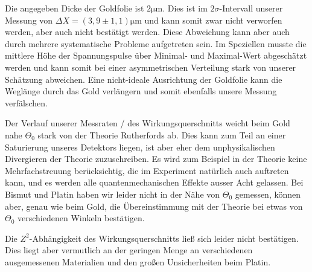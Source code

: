 Die angegeben Dicke der Goldfolie ist $2\si{\micro\meter}$.
Dies ist im $2\sigma$-Intervall unserer Messung von $\Delta X = (3,9 \pm 1,1)\si{\micro\meter}$ und kann somit zwar nicht verworfen werden,
aber auch nicht bestätigt werden. Diese Abweichung kann aber auch durch mehrere systematische Probleme aufgetreten sein.
Im Speziellen musste die mittlere Höhe der Spannungspulse über Minimal- und Maximal-Wert abgeschätzt werden und kann somit bei einer
asymmetrischen Verteilung stark von unserer Schätzung abweichen.
Eine nicht-ideale Ausrichtung der Goldfolie kann die Weglänge durch das Gold verlängern und somit ebenfalls unsere Messung verfälschen.

Der Verlauf unserer Messraten / des Wirkungsquerschnitts weicht beim Gold nahe $\Theta_0$ stark von der Theorie Rutherfords ab.
Dies kann zum Teil an einer Saturierung unseres Detektors liegen,
ist aber eher dem unphysikalischen Divergieren der Theorie zuzuschreiben.
Es wird zum Beispiel in der Theorie keine Mehrfachstreuung berücksichtig, die im Experiment natürlich auch auftreten kann,
und es werden alle quantenmechanischen Effekte ausser Acht gelassen.
Bei Bismut und Platin haben wir leider nicht in der Nähe von $\Theta_0$ gemessen,
können aber, genau wie beim Gold, die Übereinstimmung mit der Theorie bei etwas von $\Theta_0$ verschiedenen Winkeln bestätigen.

Die $Z^2$-Abhängigkeit des Wirkungsquerschnitts ließ sich leider nicht bestätigen.
Dies liegt aber vermutlich an der geringen Menge an verschiedenen ausgemessenen Materialien und den großen Unsicherheiten beim Platin.